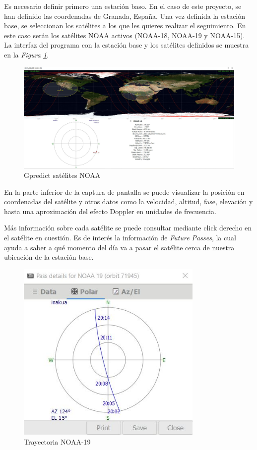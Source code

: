 \documentclass[a4paper,openright,12pt]{article}
\begin{document}
	Es necesario definir primero una estación baso. En el caso de este proyecto, se han definido las coordenadas de Granada, España. Una vez definida la estación base, se seleccionan los satélites a los que les quieres realizar el seguimiento. En este caso serán los satélites NOAA activos (NOAA-18, NOAA-19 y NOAA-15). La interfaz del programa con la estación base y los satélites definidos se muestra en la \textit{Figura \ref{gpredict}}.
	
	\begin{figure}[hbtp]
 \centering
 \includegraphics[width = 16cm]{imagenes/Gpredict_NOAA.JPG}
 \caption{Gpredict satélites NOAA}
 \label{gpredict}
 \end{figure}
 
 En la parte inferior de la captura de pantalla se puede visualizar la posición en coordenadas del satélite y otros datos como la velocidad, altitud, fase, elevación y hasta una aproximación del efecto Doppler en unidades de frecuencia.
 
 Más información sobre cada satélite se puede consultar mediante click derecho en el satélite en cuestión. Es de interés la información de \textit{Future Passes}, la cual ayuda a saber a qué momento del día va a pasar el satélite cerca de nuestra ubicación de la estación base.

	\begin{figure}[hbtp]
 \centering
 \includegraphics[width = 9cm]{imagenes/future_passes.JPG}
 \caption{Trayectoria NOAA-19}
 \label{trayectoria}
 \end{figure}
 
\end{document}
